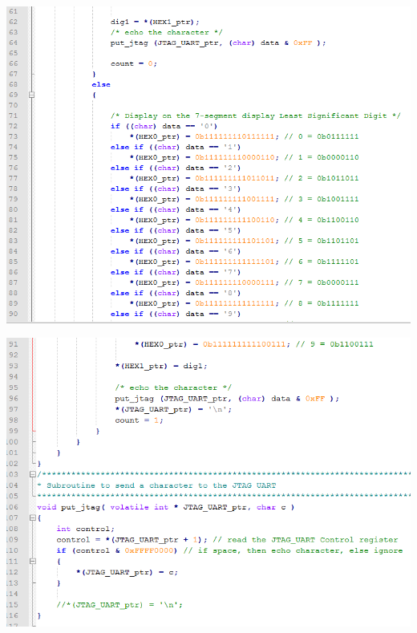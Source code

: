 \documentclass{article}
\newenvironment{Figure}
  {\par\medskip\noindent\ignorespaces\minipage{\linewidth}}
  {\endminipage\par\medskip}
\begin{document}
\begin{Figure}
 \centering
 \includegraphics[width=\linewidth]{c3.png}
\end{Figure}

\begin{Figure}
 \centering
 \includegraphics[width=\linewidth]{c4.png}
\end{Figure}


\end{document}

